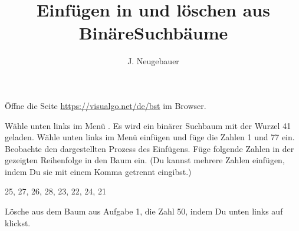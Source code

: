 \documentclass[10pt, a4paper]{scrartcl}
\author{J. Neugebauer}
\title{Einfügen in und löschen aus BinäreSuchbäume}
\date{\Heute}
\begin{document}
\ReiheTitel

Öffne die Seite \url{https://visualgo.net/de/bst} im Browser. 

\begin{aufgabe}[subtitle=Einfügen,symbol=\symPartner\,\symLaptop]
\begin{teilaufgaben}
	\teilaufgabe Wähle unten links im Menü . Es wird ein binärer Suchbaum mit der Wurzel \num{41} geladen.
	\teilaufgabe Wähle unten links im Menü einfügen und füge die Zahlen \num{1} und \num{77} ein. Beobachte den dargestellten Prozess des Einfügens.
	\teilaufgabe Füge folgende Zahlen in der gezeigten Reihenfolge in den Baum ein. (Du kannst mehrere Zahlen einfügen, indem Du sie mit einem Komma getrennt eingibst.)
	
		\num{25}, \num{27}, \num{26}, \num{28}, \num{23}, \num{22}, \num{24}, \num{21}
\end{teilaufgaben}
\end{aufgabe}

\begin{aufgabe}[subtitle=Löschen,symbol=\symPartner\,\symLaptop]
\begin{teilaufgaben}
	\teilaufgabe Lösche aus dem Baum aus Aufgabe 1, die Zahl \num{50}, indem Du unten links auf  klickst.
\end{teilaufgaben}
\end{aufgabe}
\end{document}
